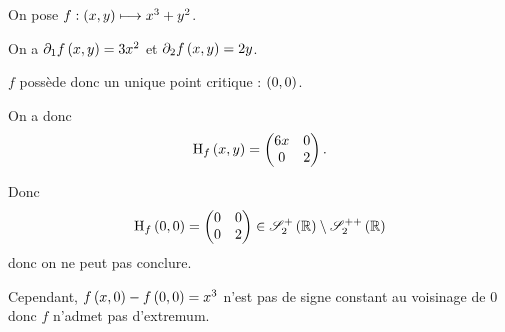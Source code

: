 \begin{corr}
On pose \(f:\left(x,y\right)\longmapsto x^3+y^2\).

On a \(\pdif{1}f\paren{x,y}=3x^2\) et \(\pdif{2}f\paren{x,y}=2y\).

\(f\) possède donc un unique point critique : \(\left(0,0\right)\).

On a donc \[\operatorname{H}_{f}\left(x,y\right)=\begin{pmatrix}
6x & 0 \\
0 & 2
\end{pmatrix}.\]

Donc \[\hessienne{f}\paren{0,0}=\begin{pmatrix}
0 & 0 \\
0 & 2
\end{pmatrix}\in\sympos{2}[\R]\excluant\symdefpos{2}[\R]\] donc on ne peut pas conclure.

Cependant, \(f\left(x,0\right)-f\left(0,0\right)=x^3\) n'est pas de signe constant au voisinage de \(0\) donc \(f\) n'admet pas d'extremum.
\end{corr}
